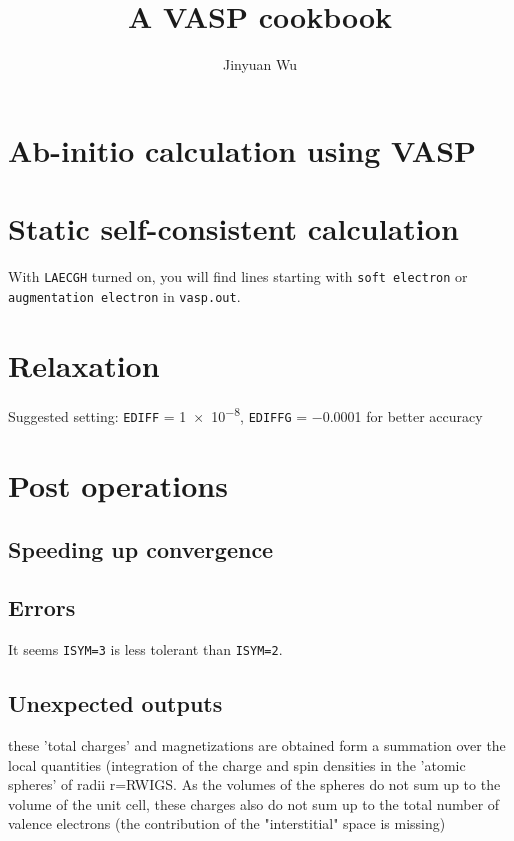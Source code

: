 \documentclass[hyperref, a4paper]{article}
\title{A VASP cookbook}
\author{Jinyuan Wu}
\begin{document}
\maketitle

\section{Ab-initio calculation using VASP}

\section{Static self-consistent calculation}

With \texttt{LAECGH} turned on, you will find lines starting with \texttt{soft electron} or \texttt{augmentation electron} in \texttt{vasp.out}.

\section{Relaxation}

Suggested setting: \texttt{EDIFF} = \num{1e-8}, \texttt{EDIFFG} = \num{-0.0001} for better accuracy

\section{Post operations}

\subsection{Speeding up convergence}

\subsection{Errors}

It seems \texttt{ISYM=3} is less tolerant than \texttt{ISYM=2}.

\subsection{Unexpected outputs}

these 'total charges' and magnetizations are obtained form a summation over the local quantities (integration of the charge and spin densities in the 'atomic spheres' of radii r=RWIGS. As the volumes of the spheres do not sum up to the volume of the unit cell, these charges also do not sum up to the total number of valence electrons (the contribution of the "interstitial" space is missing)
\end{document}
